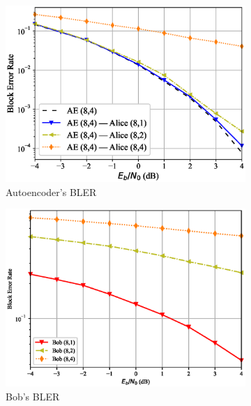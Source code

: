 \begin{figure}[tp!]
	\begin{subfigure}{0.3\textwidth}
		\includegraphics[width=\linewidth]{figs/covert_autoencoder_bler_awgn}
		\caption{Autoencoder's BLER}
		\label{fig:awgn_resutls_ae}
	\end{subfigure}
	\hspace*{\fill}
	\begin{subfigure}{0.3\textwidth}
		\includegraphics[width=\linewidth]{figs/bob_bler_awgn}
		\caption{Bob's BLER}	
		\label{fig:awgn_resutls_bob}
	\end{subfigure}
	\hspace*{\fill}
	\begin{subfigure}{0.3\textwidth}

\end{subfigure}
\end{figure}
